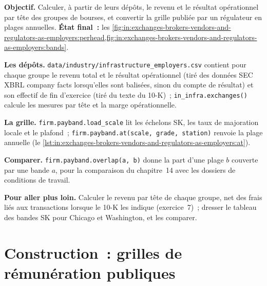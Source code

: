 \begin{tutorial}
\textbf{Objectif.} Calculer, à partir de leurs dépôts, le revenu et le résultat opérationnel par tête des groupes de bourses, et
convertir la grille publiée par un régulateur en plages annuelles. \textbf{État final~:}
les \cref{fig:in:exchanges-brokers-vendors-and-regulators-as-employers:perhead,fig:in:exchanges-brokers-vendors-and-regulators-as-employers:bands}.
\begin{tutsteps}
\item \textbf{Les dépôts.} \texttt{data/industry/infrastructure\_employers.csv} contient pour chaque groupe le revenu total et
le résultat opérationnel (tiré des données SEC XBRL company facts lorsqu'elles sont balisées, sinon du compte de résultat) et son effectif de fin d'exercice (tiré
du texte du 10-K)~; \texttt{in\_infra.exchanges()} calcule les mesures par tête et la marge opérationnelle.
\item \textbf{La grille.} \texttt{firm.payband.load\_scale} lit les échelons SK, les taux de majoration locale et le plafond~;
\texttt{firm.payband.at(scale, grade, station)} renvoie la plage annuelle
(le \cref{lst:in:exchanges-brokers-vendors-and-regulators-as-employers:at}).
\label{lst:in:exchanges-brokers-vendors-and-regulators-as-employers:at}
\item \textbf{Comparer.} \texttt{firm.payband.overlap(a, b)} donne la part d'une plage $b$ couverte par une bande $a$, pour
la comparaison du chapitre~14 avec les dossiers de conditions de travail.
\end{tutsteps}
\end{tutorial}

\textbf{Pour aller plus loin.} Calculer le revenu par tête de chaque groupe, net des frais liés aux transactions lorsque le 10-K
les indique (exercice~7)~; dresser le tableau des bandes SK pour Chicago et Washington, et les comparer.

\section{Construction~: grilles de rémunération publiques}\label{bld:in:exchanges-brokers-vendors-and-regulators-as-employers:payband}

